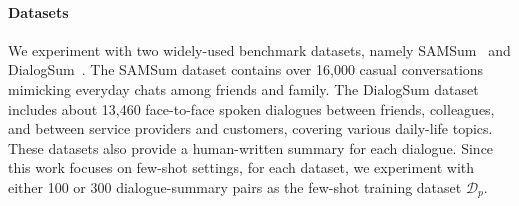 



\paragraph{Datasets} We experiment with two widely-used benchmark datasets, namely SAMSum~\citep{gliwa-etal-2019-samsum} and DialogSum~\citep{chen2021dialogsum}. The SAMSum dataset contains over 16,000 casual conversations mimicking everyday chats among friends and family. The DialogSum dataset includes about 13,460 face-to-face spoken dialogues between friends, colleagues, and between service providers and customers, covering various daily-life topics. These datasets also provide a human-written summary for each dialogue. Since this work focuses on few-shot settings, for each dataset, we experiment with either 100 or 300 dialogue-summary pairs as the few-shot training dataset $\mathcal{D}_p$.



